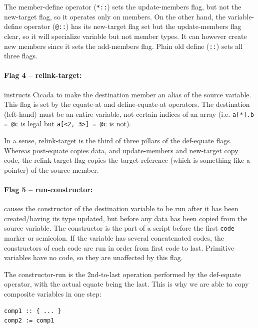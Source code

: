 \documentclass{article}
\newenvironment{code}{
       \begin{list}{}{
               \setlength{\leftmargin}{.4in}
               \setlength{\rightmargin}{0in}
               \setlength{\topsep}{.2in}
       }
       \small
       \item[] }
       { \end{list}   }
\begin{document}
The member-define operator (\verb#*::#) sets the update-members flag, but not the new-target flag, so it operates only on members.  On the other hand, the variable-define operator (\verb#@::#) has its new-target flag set but the update-members flag clear, so it will specialize variable but not member types.  It can however create new members since it sets the add-members flag.  Plain old define (\verb#::#) sets all three flags.\\


\paragraph{Flag 4 -- relink-target:}  instructs Cicada to make the destination member an alias of the source variable.  This flag is set by the equate-at and define-equate-at operators.  The destination (left-hand) must be an entire variable, not certain indices of an array (i.e. \verb#a[*].b = @c# is legal but \verb#a[<2, 3>] = @c# is not).

In a sense, relink-target is the third of three pillars of the def-equate flags.  Whereas post-equate copies data, and update-members and new-target copy code, the relink-target flag copies the target reference (which is something like a pointer) of the source member.\\


\paragraph{Flag 5 -- run-constructor:}  causes the constructor of the destination variable to be run after it has been created/having its type updated, but before any data has been copied from the source variable.  The constructor is the part of a script before the first \verb#code# marker or semicolon.  If the variable has several concatenated codes, the constructors of each code are run in order from first code to last.  Primitive variables have no code, so they are unaffected by this flag.

The constructor-run is the 2nd-to-last operation performed by the def-equate operator, with the actual equate being the last.  This is why we are able to copy composite variables in one step:

\begin{code} \begin{verbatim}
comp1 :: { ... }
comp2 := comp1
\end{verbatim} \end{code}
\end{document}
